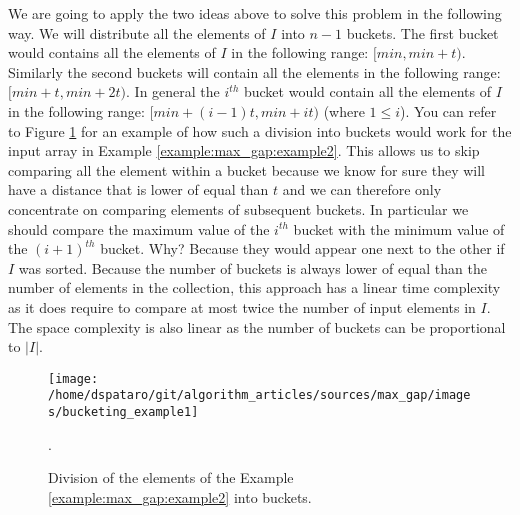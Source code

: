 We are going to apply the two ideas above to solve this problem in the following way. We will
distribute all the elements of $I$ into $n-1$ buckets. The first bucket would contains all the
elements of $I$ in the following range: $[min, min + t)$. Similarly the second buckets will contain
all the elements in the following range: $[min + t, min + 2t)$. In general the $i^{th}$ bucket
would contain all the elements of $I$ in the following range: $[min + (i-1)t, min+it)$ (where $ 1
\leq i$). You can refer to Figure \ref{fig:max_gap:bucketing_example2} for an example of how such a
division into buckets would work for the input array in Example \ref{example:max_gap:example2}. This
allows us to skip comparing all the element within a bucket because we know for sure they will have
a distance that is lower of equal than $t$ and we can therefore only concentrate on comparing
elements of subsequent buckets. In particular we should compare the maximum value of the $i^{th}$
bucket with the minimum value of the $(i+1)^{th}$ bucket. Why? Because they would appear one next to
the other if $I$ was sorted. Because the number of buckets is always lower of equal than the number
of elements in the collection, this approach has a linear time complexity as it does require to
compare at most twice the number of input elements in $I$. The space complexity is also linear as
the number of buckets can be proportional to $|I|$.
\begin{figure}
	\centering
	\texttt{[image: /home/dspataro/git/algorithm\_articles/sources/max\_gap/images/bucketing\_example1]}
	\caption{Division of the elements of the Example \ref{example:max_gap:example2} into buckets.}.
	\label{fig:max_gap:bucketing_example2}
\end{figure}


